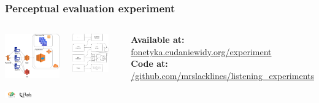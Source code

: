\documentclass[a4paper,9pt]{beamer}
\theoremstyle{mytheoremstyle}
\begin{document}
\begin{frame}
\frametitle{Perceptual evaluation experiment}
\begin{columns}
\begin{column}{0.5\textwidth}
\begin{center}
  \includegraphics[width=\textwidth]{res/experiment_infra}
\end{center}
  \includegraphics[width=0.5\textwidth]{res/experiment_stack}
\end{column}
  \includegraphics[width=0.8\textwidth]{res/experiment_diagram}
  \scriptsize{
\begin{exampleblock}{}
\textbf{Available at:}\\
\url{fonetyka.cudaniewidy.org/experiment}\\
\textbf{Code at:}\\
\url{/github.com/mrslacklines/listening_experiments}
\end{exampleblock}
}
\end{columns}
\end{frame}
\end{document}
